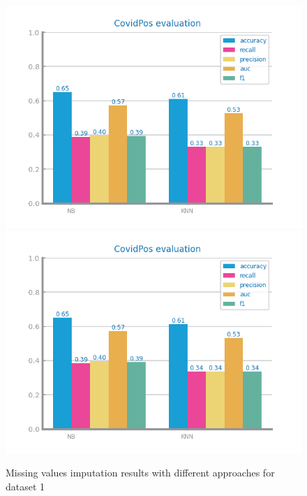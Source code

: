 \documentclass[10pt]{extarticle}
\begin{document}
\begin{figure}[H]
\centering\includegraphics[scale=0.80]{images/dataset1/data_preparation/CovidPos_mvi_freq_eval.png}
\includegraphics[scale=0.80]{images/dataset1/data_preparation/CovidPos_mvi_knn_eval.png}
\caption{Missing values imputation results with different approaches for dataset 1}
\end{figure}
\end{document}
